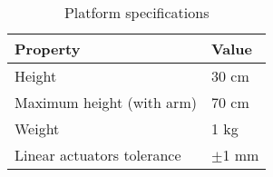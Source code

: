 \begin{table}[h]
    \centering
    \caption{Platform specifications}
    \label{tab:platform-specifications}
    \begin{tabular}{ll}
    \toprule
    Property & Value \\
    \midrule
    Height  & 30 cm \\
    Maximum height (with arm) & 70 cm \\
    Weight & 1 kg \\
    Linear actuators tolerance & $\pm$1 mm \\
    \bottomrule
    \end{tabular}
\end{table}